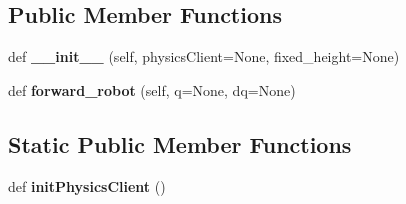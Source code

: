 \subsection*{Public Member Functions}
\begin{DoxyCompactItemize}
\item 
\mbox{\label{classpy__robot__properties__teststand_1_1teststand__wrapper_1_1TeststandRobot_a627d6d55ef3784570f85bd3f6f683e28}} 
def {\bfseries \+\_\+\+\_\+init\+\_\+\+\_\+} (self, physics\+Client=None, fixed\+\_\+height=None)
\item 
\mbox{\label{classpy__robot__properties__teststand_1_1teststand__wrapper_1_1TeststandRobot_aae85594daabfb7a0b44731b2dab5ce5e}} 
def {\bfseries forward\+\_\+robot} (self, q=None, dq=None)
\end{DoxyCompactItemize}
\subsection*{Static Public Member Functions}
\begin{DoxyCompactItemize}
\item 
\mbox{\label{classpy__robot__properties__teststand_1_1teststand__wrapper_1_1TeststandRobot_ab700000fd34f7e37de71798e7fdb76b7}} 
def {\bfseries init\+Physics\+Client} ()
\end{DoxyCompactItemize}
